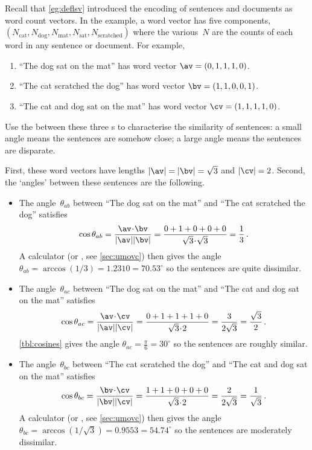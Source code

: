 \begin{example} \label{eg:lsidot}
Recall that \autoref{eg:deflsv} introduced the encoding of sentences and documents as word count vectors.
In the example, a word vector has five components, \((N_{\text{cat}},N_{\text{dog}},N_{\text{mat}},N_{\text{sat}},N_{\text{scratched}})\) where the various~\(N\) are the counts of each word in any sentence or document. For example,
\begin{enumerate}
\item ``The dog sat on the mat'' has word vector \(\av=(0,1,1,1,0)\).
\item ``The cat scratched the dog'' has word vector \(\bv=(1,1,0,0,1)\).
\item ``The cat and dog sat on the mat'' has word vector \(\cv=(1,1,1,1,0)\).
\end{enumerate}
Use the  between these three s to characterise the similarity of sentences: a small angle means the sentences are somehow close; a large angle means the sentences are disparate.
\begin{solution} 
First, these word vectors have lengths \(|\av|=|\bv|=\sqrt3\) and \(|\cv|=2\).
Second, the `angles' between these sentences are the following.
\begin{itemize}
\item The angle~\(\theta_{ab}\) between ``The dog sat on the mat'' and ``The cat scratched the dog'' satisfies
\begin{equation*}
\cos\theta_{ab}=\frac{\av\cdot\bv}{|\av||\bv|}
=\frac{0+1+0+0+0}{\sqrt3\cdot\sqrt3}=\frac13\,.
\end{equation*}
A calculator  (or \script, see \autoref{sec:umovc}) then gives the angle \(\theta_{ab} =\arccos(1/3) =1.2310=70.53^\circ\) so the sentences are quite dissimilar.

\item The angle~\(\theta_{ac}\) between ``The dog sat on the mat'' and ``The cat and dog sat on the mat'' satisfies
\begin{equation*}
\cos\theta_{ac}=\frac{\av\cdot\cv}{|\av||\cv|}
=\frac{0+1+1+1+0}{\sqrt3\cdot2}=\frac3{2\sqrt3}=\frac{\sqrt3}2\,.
\end{equation*}
\autoref{tbl:cosines} gives the angle \(\theta_{ac}=\tfrac\pi6=30^\circ\) so the sentences are roughly similar.

\item The angle~\(\theta_{bc}\) between ``The cat scratched the dog'' and ``The cat and dog sat on the mat'' satisfies
\begin{equation*}
\cos\theta_{bc}=\frac{\bv\cdot\cv}{|\bv||\cv|}
=\frac{1+1+0+0+0}{\sqrt3\cdot2}=\frac2{2\sqrt3}=\frac1{\sqrt3}\,.
\end{equation*}
A calculator  (or \script, see \autoref{sec:umovc}) then gives the angle \(\theta_{bc} =\arccos(1/\sqrt3) =0.9553 =54.74^\circ\) so the sentences are moderately dissimilar.


\end{itemize}
\end{solution}
\end{example}
